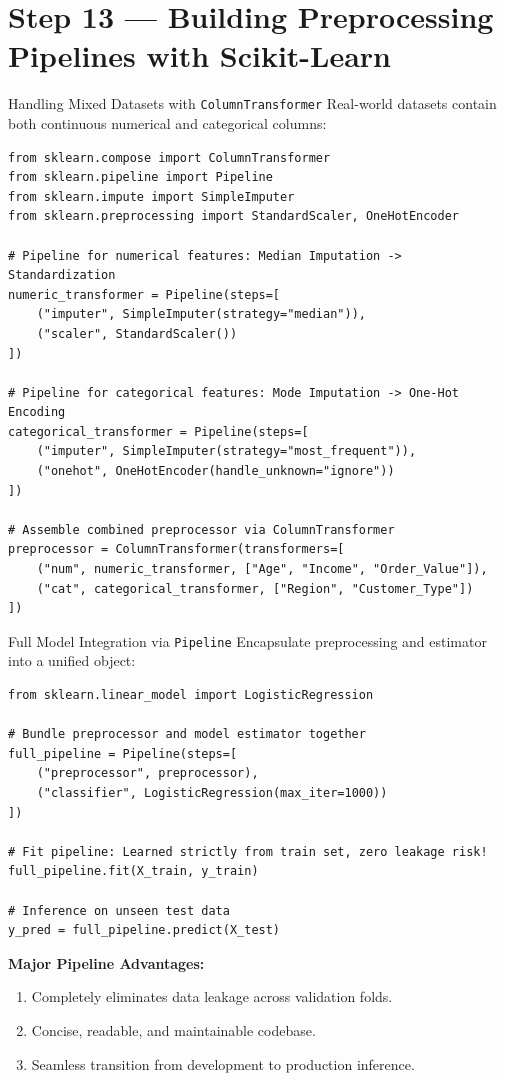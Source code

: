 \documentclass[aspectratio=169,11pt]{beamer}
\newcommand{\smallgap}{\vspace{0.35em}}
\begin{document}
\section{Step 13 — Building Preprocessing Pipelines with Scikit-Learn}

\begin{frame}[fragile]{Handling Mixed Datasets with \texttt{ColumnTransformer}}
Real-world datasets contain both continuous numerical and categorical columns:
\begin{lstlisting}[style=tinypythonstyle]
from sklearn.compose import ColumnTransformer
from sklearn.pipeline import Pipeline
from sklearn.impute import SimpleImputer
from sklearn.preprocessing import StandardScaler, OneHotEncoder

# Pipeline for numerical features: Median Imputation -> Standardization
numeric_transformer = Pipeline(steps=[
    ("imputer", SimpleImputer(strategy="median")),
    ("scaler", StandardScaler())
])

# Pipeline for categorical features: Mode Imputation -> One-Hot Encoding
categorical_transformer = Pipeline(steps=[
    ("imputer", SimpleImputer(strategy="most_frequent")),
    ("onehot", OneHotEncoder(handle_unknown="ignore"))
])

# Assemble combined preprocessor via ColumnTransformer
preprocessor = ColumnTransformer(transformers=[
    ("num", numeric_transformer, ["Age", "Income", "Order_Value"]),
    ("cat", categorical_transformer, ["Region", "Customer_Type"])
])
\end{lstlisting}
\end{frame}

\begin{frame}[fragile]{Full Model Integration via \texttt{Pipeline}}
Encapsulate preprocessing and estimator into a unified object:
\begin{lstlisting}[style=pythonstyle]
from sklearn.linear_model import LogisticRegression

# Bundle preprocessor and model estimator together
full_pipeline = Pipeline(steps=[
    ("preprocessor", preprocessor),
    ("classifier", LogisticRegression(max_iter=1000))
])

# Fit pipeline: Learned strictly from train set, zero leakage risk!
full_pipeline.fit(X_train, y_train)

# Inference on unseen test data
y_pred = full_pipeline.predict(X_test)
\end{lstlisting}

\smallgap
\textbf{Major Pipeline Advantages:}
\begin{enumerate}
  \item Completely eliminates data leakage across validation folds.
  \item Concise, readable, and maintainable codebase.
  \item Seamless transition from development to production inference.
\end{enumerate}
\end{frame}
\end{document}
